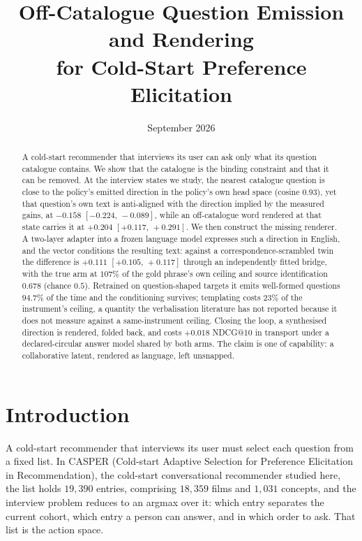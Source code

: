 \documentclass[11pt]{article}
\title{Off-Catalogue Question Emission and Rendering\\
for Cold-Start Preference Elicitation}
\author{}
\date{September 2026}
\begin{document}
\maketitle

\begin{abstract}
\noindent A cold-start recommender that interviews its user can ask only what its question catalogue
contains. We show that the catalogue is the binding constraint and that it can be removed. At the
interview states we study, the nearest catalogue question is close to the policy's emitted direction
in the policy's own head space (cosine $0.93$), yet that question's own text is anti-aligned with the
direction implied by the measured gains, at $-0.158$ $[-0.224,\,-0.089]$, while an off-catalogue word
rendered at that state carries it at $+0.204$ $[+0.117,\,+0.291]$. We then construct the missing
renderer. A two-layer adapter into a frozen language model expresses such a direction in English, and
the vector conditions the resulting text: against a correspondence-scrambled twin the difference is
$+0.111$ $[+0.105,\,+0.117]$ through an independently fitted bridge, with the true arm at $107\%$ of
the gold phrase's own ceiling and source identification $0.678$ (chance $0.5$). Retrained on
question-shaped targets it emits well-formed questions $94.7\%$ of the time and the conditioning
survives; templating costs $23\%$ of the instrument's ceiling, a quantity the verbalisation literature
has not reported because it does not measure against a same-instrument ceiling. Closing the loop, a
synthesised direction is rendered, folded back, and costs $+0.018$ NDCG@10 in transport under a
declared-circular answer model shared by both arms. The claim is one of capability: a collaborative
latent, rendered as language, left unsnapped.
\end{abstract}

\section{Introduction}
\label{sec:intro}

A cold-start recommender that interviews its user must select each question from a fixed list. In CASPER
(Cold-start Adaptive Selection for Preference Elicitation in Recommendation), the cold-start
conversational recommender studied here, the list holds $19{,}390$ entries, comprising $18{,}359$ films and $1{,}031$
concepts, and the interview problem reduces to an argmax over it: which entry separates the current
cohort, which entry a person can answer, and in which order to ask. That list is the action space.
\end{document}

